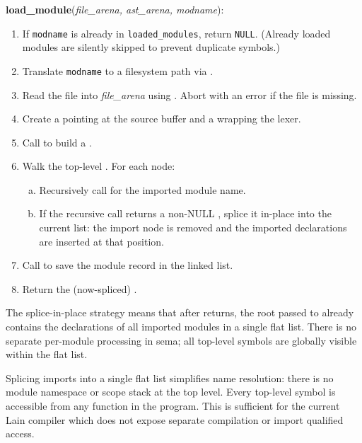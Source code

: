 \begin{algorithm}
\textbf{load\_module}(\textit{file\_arena, ast\_arena, modname}):
\begin{enumerate}
\item If \texttt{modname} is already in \texttt{loaded\_modules}, return \texttt{NULL}.
  (Already loaded modules are silently skipped to prevent duplicate symbols.)
\item Translate \texttt{modname} to a filesystem path via
  .
\item Read the file into \textit{file\_arena} using .
  Abort with an error if the file is missing.
\item Create a  pointing at the source buffer and a 
  wrapping the lexer.
\item Call  to build a .
\item Walk the top-level .  For each  node:
  \begin{enumerate}[(a)]
  \item Recursively call  for the imported module name.
  \item If the recursive call returns a non-NULL , splice it
    in-place into the current list: the import node is removed and the imported
    declarations are inserted at that position.
  \end{enumerate}
\item Call  to save the module record in the linked list.
\item Return the (now-spliced) .
\end{enumerate}
\end{algorithm}

\pnum
The splice-in-place strategy means that after  returns, the
root  passed to  already contains
the declarations of all imported modules in a single flat list.  There is no
separate per-module processing in sema; all top-level symbols are globally visible
within the flat list.

\begin{rationale}
Splicing imports into a single flat list simplifies name resolution: there is no
module namespace or scope stack at the top level.  Every top-level symbol is
accessible from any function in the program.  This is sufficient for the current
Lain compiler which does not expose separate compilation or import qualified access.
\end{rationale}

